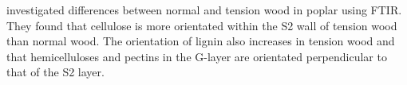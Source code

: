 \citet{Chang_2013} investigated differences between normal and tension wood in poplar using FTIR. They found that cellulose is more orientated within the S2 wall of tension wood than normal wood. The orientation of lignin also increases in tension wood and that hemicelluloses and pectins in the G-layer are orientated perpendicular to that of the S2 layer. 